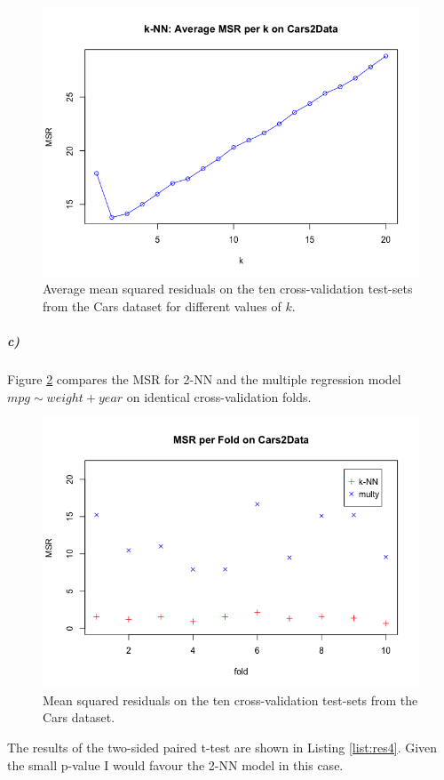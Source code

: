 \documentclass{paper}
\begin{document}
\begin{figure}[h]
\begin{center}
\includegraphics[width=0.8\linewidth]{knnCars}
\end{center}
\caption{Average mean squared residuals on the ten cross-validation test-sets from the Cars dataset  for different values of $k$. }
\label{fig:knnCars}
\end{figure}


\subparagraph{c)}

Figure \ref{fig:vsCars} compares the MSR for 2-NN and the multiple regression model $mpg\sim weight+year$ 
on identical cross-validation folds. 

\begin{figure}[h]
\begin{center}
\includegraphics[width=0.8\linewidth]{vsCars}
\end{center}
\caption{Mean squared residuals on the ten cross-validation test-sets from the Cars dataset.  }
\label{fig:vsCars}
\end{figure}

The results of the two-sided paired t-test are shown in Listing \ref{list:res4}. Given the small p-value I would favour the 2-NN model in this case.
\end{document}
